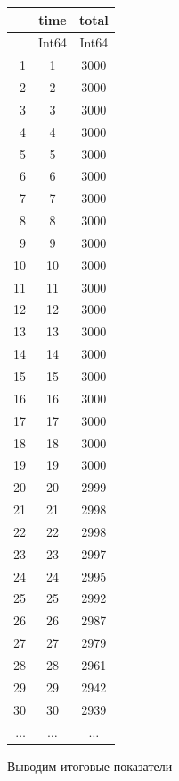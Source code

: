 \documentclass[
  12pt,
  a4paper,
  DIV=11,
  numbers=noendperiod]{scrreprt}
\begin{document}
\begin{tabular}{r|cc}
    & time & total\\
    \hline
    & Int64 & Int64\\
    \hline
    1 & 1 & 3000 \\
    2 & 2 & 3000 \\
    3 & 3 & 3000 \\
    4 & 4 & 3000 \\
    5 & 5 & 3000 \\
    6 & 6 & 3000 \\
    7 & 7 & 3000 \\
    8 & 8 & 3000 \\
    9 & 9 & 3000 \\
    10 & 10 & 3000 \\
    11 & 11 & 3000 \\
    12 & 12 & 3000 \\
    13 & 13 & 3000 \\
    14 & 14 & 3000 \\
    15 & 15 & 3000 \\
    16 & 16 & 3000 \\
    17 & 17 & 3000 \\
    18 & 18 & 3000 \\
    19 & 19 & 3000 \\
    20 & 20 & 2999 \\
    21 & 21 & 2998 \\
    22 & 22 & 2998 \\
    23 & 23 & 2997 \\
    24 & 24 & 2995 \\
    25 & 25 & 2992 \\
    26 & 26 & 2987 \\
    27 & 27 & 2979 \\
    28 & 28 & 2961 \\
    29 & 29 & 2942 \\
    30 & 30 & 2939 \\
    $\dots$ & $\dots$ & $\dots$ \\
\end{tabular}

Выводим итоговые показатели
\end{document}
